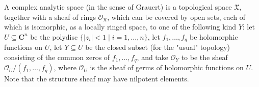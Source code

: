 A complex analytic space (in the sense of Grauert) is a topological space $\mathfrak{X}$, together with a sheaf of rings $\mathcal{O}_{\mathfrak{X}}$, which can be covered by open sets, each of which is isomorphic, as a locally ringed space, to one of the following kind $Y$: let $U \subseteq \mathbf{C}^n$ be the polydisc $\{|z_i| < 1 \mid i = 1, \ldots, n\}$, let $f_1, \ldots, f_q$ be holomorphic functions on $U$, let $Y \subseteq U$ be the closed subset (for the "usual" topology) consisting of the common zeros of $f_1, \ldots, f_q$, and take $\mathcal{O}_Y$ to be the sheaf $\mathcal{O}_U / (f_1, \ldots, f_q)$, where $\mathcal{O}_U$ is the sheaf of germs of holomorphic functions on $U$. Note that the structure sheaf may have nilpotent elements.
